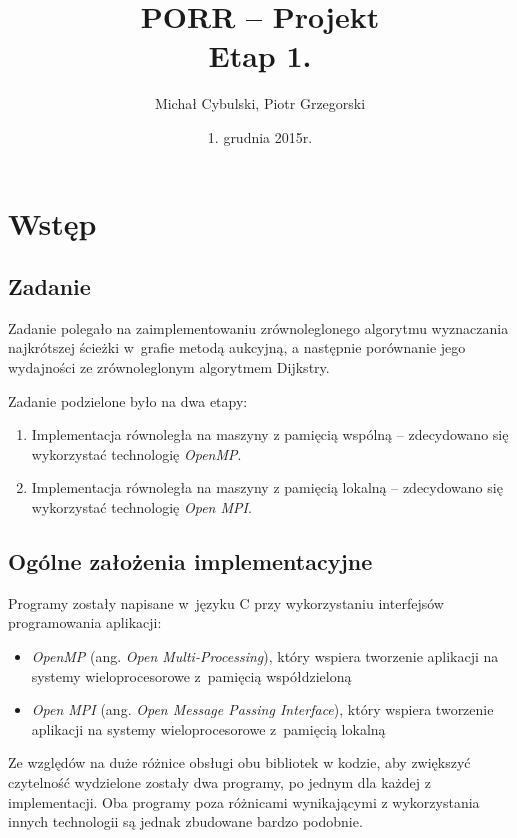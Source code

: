 \documentclass {report}
\author {Michał Cybulski, Piotr Grzegorski}
\title {PORR -- Projekt\\Etap 1.}
\date {1. grudnia 2015r.}
\begin{document}
\maketitle

\tableofcontents

\chapter{Wstęp}

\section{Zadanie}

Zadanie polegało na zaimplementowaniu zrównoleglonego algorytmu wyznaczania najkrótszej ścieżki w~grafie metodą aukcyjną, a następnie porównanie jego wydajności ze zrównoleglonym algorytmem Dijkstry.

Zadanie podzielone było na dwa etapy:
\begin{enumerate}
	\item Implementacja równoległa na maszyny z pamięcią wspólną -- zdecydowano się wykorzystać technologię \emph{OpenMP}.
	\item Implementacja równoległa na maszyny z pamięcią lokalną -- zdecydowano się wykorzystać technologię \emph{Open MPI}.
\end{enumerate}

\section{Ogólne założenia implementacyjne}

Programy zostały napisane w~języku C przy wykorzystaniu interfejsów programowania aplikacji:
\begin{itemize}
	\item \emph{OpenMP} (ang. \emph{Open Multi-Processing}), który wspiera tworzenie aplikacji na systemy wieloprocesorowe z~pamięcią współdzieloną
	\item \emph{Open MPI} (ang. \emph{Open Message Passing Interface}), który wspiera tworzenie aplikacji na systemy wieloprocesorowe z~pamięcią lokalną
\end{itemize}

Ze względów na duże różnice obsługi obu bibliotek w kodzie, aby zwiększyć czytelność wydzielone zostały dwa programy, po jednym dla każdej z implementacji. Oba programy poza różnicami wynikającymi z wykorzystania innych technologii są jednak zbudowane bardzo podobnie.
\end{document}
